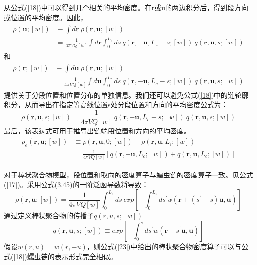 从公式(\ref{18})中可以得到几个相关的平均密度。在r或u的两边积分后，得到段方向或位置的平均密度。因此，
\begin{align}\label{19}
\begin{split}
\rho(\mathbf{u};[w])&\equiv\int d\mathbf{r}~\rho(\mathbf{r},\mathbf{u};[w]) \\&=\frac{1}{4\pi VQ[w]}\int d\mathbf{r} \int_{0}^{L_c}ds~q(\mathbf{r},-\mathbf{u},L_c-s;[w])~q(\mathbf{r},\mathbf{u},s;[w])
\end{split}
\end{align}
和
\begin{align}\label{20}
\begin{split}
\rho(\mathbf{r};[w])&\equiv\int d\mathbf{u}~\rho(\mathbf{r},\mathbf{u};[w]) \\&=\frac{1}{4\pi VQ[w]}\int d\mathbf{u} \int_{0}^{L_c}ds~q(\mathbf{r},-\mathbf{u},L_c-s;[w])~q(\mathbf{r},\mathbf{u},s;[w])
\end{split}
\end{align}
提供关于分段位置和位置分布的单独信息。我们还可以避免公式(\ref{18})中的链轮廓积分，从而导出在指定等高线位置s处分段位置和方向的平均密度公式为：
\begin{equation}\label{21}
\rho(\mathbf{r},\mathbf{u},s;[w])=\frac{1}{4\pi VQ[w]}~q(\mathbf{r},-\mathbf{u},L_c-s;[w])~q(\mathbf{r},\mathbf{u},s;[w])
\end{equation}
最后，该表达式可用于推导出链端段位置和方向的平均密度。
\begin{align}\label{22}
\begin{split}
\rho_e(\mathbf{r},\mathbf{u};[w])&\equiv\rho(\mathbf{r},\mathbf{u},0;[w])+\rho(\mathbf{r},\mathbf{u},L_c;[w])\\ &=\frac{1}{4\pi VQ[w]}[q(\mathbf{r},-\mathbf{u},L_c;[w])+q(\mathbf{r},\mathbf{u},L_c;[w])]
\end{split}
\end{align}

对于棒状聚合物模型，段位置和取向的密度算子与蠕虫链的密度算子一致。见公式(\ref{17})。采用公式(3.45)的一阶泛函导数将导致：
\begin{equation}\label{23}
\rho(\mathbf{r},\mathbf{u};[w])=\frac{1}{4\pi VQ[w]}\int_{0}^{L_c}ds~exp[-\int_{0}^{L_c}ds^{'}w (\mathbf{r}+(s^{'}-s)\mathbf{u},\mathbf{u})]
\end{equation}
通过定义棒状聚合物的传播子$q(r,u,s;[w])$
\begin{equation}\label{24}
q(\mathbf{r},\mathbf{u},s;[w])\equiv exp[-\int_{0}^{s}ds^{'}w(\mathbf{r}-s^{'}\mathbf{u},\mathbf{u})]
\end{equation}
假设$w(r,u)=w(r,-u)$，则公式(\ref{23})中给出的棒状聚合物密度算子可以与公式(\ref{18})蠕虫链的表示形式完全相似。

